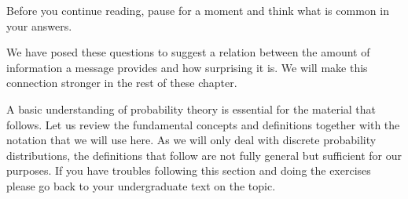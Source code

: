 Before you continue reading, pause for a moment and think what is common in your answers.

We have posed these questions to suggest a relation between the amount of information a message provides and how surprising it is. 
We will make this connection stronger in the rest of these chapter. %

A basic understanding of probability theory is essential for the material that follows. 
Let us review the fundamental concepts and definitions together with the notation that we will use here. 
As we will only deal with discrete probability distributions, the definitions that follow are not fully general but sufficient for our purposes.
If you have troubles following this section and doing the exercises please go back to your undergraduate text on the topic. 


